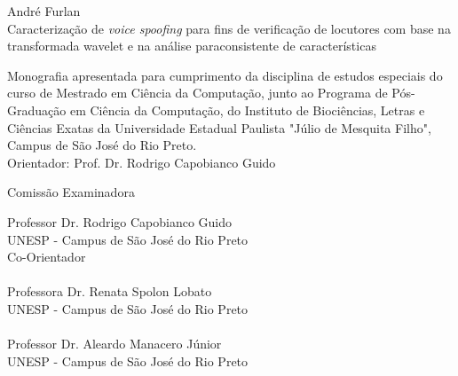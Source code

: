 \documentclass[a4paper,12pt,openright,oneside]{book}
\begin{document}
	\begin{center}
		\vspace{4cm}
		\fontsize{14}{\baselineskip} \selectfont
		\vspace{30.0pt}
		{André Furlan} \\ \vspace{30.0pt}
		{Caracterização de \textit{voice spoofing} para fins de verificação de locutores com base na transformada wavelet e na análise paraconsistente de características} \\ \onehalfspacing \fontsize{14}{\baselineskip} \selectfont
		\par \null
		\begin{flushright}
		\parbox{3.50in}{
			\fontsize{12}{\baselineskip} \selectfont \onehalfspacing
			Monografia apresentada para cumprimento da disciplina de estudos especiais do curso de Mestrado em Ciência da Computação, junto ao Programa de Pós-Graduação em Ciência da Computação, do Instituto de Biociências, Letras e Ciências Exatas da Universidade Estadual Paulista "Júlio de Mesquita Filho", Campus de São José do Rio Preto. \\ \vspace{1.0pt}
			{Orientador: Prof. Dr. Rodrigo Capobianco Guido } \\ \vspace{1.0pt}
		}
		\end{flushright}
		\fontsize{14}{\baselineskip} \selectfont
		Comissão Examinadora \\  \vspace{1.0pt}
	\end{center}

	\fontsize{14}{\baselineskip} \selectfont
	Professor Dr. Rodrigo Capobianco Guido \\ 
	UNESP - Campus de São José do Rio Preto \\
	Co-Orientador \\\\
	
	Professora Dr. Renata Spolon Lobato \\ 
	UNESP - Campus de São José do Rio Preto \\\\
	
	Professor Dr. Aleardo Manacero Júnior \\
	UNESP - Campus de São José do Rio Preto \\\\
	\vspace{3.0cm}
\end{document}
